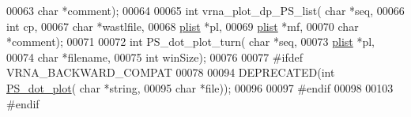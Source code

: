\begin{DoxyCode}
00063                       \textcolor{keywordtype}{char} *comment);
00064 
00065 \textcolor{keywordtype}{int} vrna\_plot\_dp\_PS\_list( \textcolor{keywordtype}{char} *seq,
00066                           \textcolor{keywordtype}{int} cp,
00067                           \textcolor{keywordtype}{char} *wastlfile,
00068                           \hyperlink{group__data__structures_structvrna__plist__s}{plist} *pl,
00069                           \hyperlink{group__data__structures_structvrna__plist__s}{plist} *mf,
00070                           \textcolor{keywordtype}{char} *comment);
00071 
00072 \textcolor{keywordtype}{int} PS\_dot\_plot\_turn( \textcolor{keywordtype}{char} *seq,
00073                       \hyperlink{group__data__structures_structvrna__plist__s}{plist} *pl,
00074                       \textcolor{keywordtype}{char} *filename,
00075                       \textcolor{keywordtype}{int} winSize);
00076 
00077 \textcolor{preprocessor}{#ifdef VRNA\_BACKWARD\_COMPAT}
00078 
00094 DEPRECATED(\textcolor{keywordtype}{int} \hyperlink{group__plotting__utils_ga689a97a7e3b8a2df14728b8204d9d57b}{PS\_dot\_plot}( \textcolor{keywordtype}{char} *\textcolor{keywordtype}{string},
00095                             \textcolor{keywordtype}{char} *file));
00096 
00097 \textcolor{preprocessor}{#endif}
00098 
00103 \textcolor{preprocessor}{#endif}
\end{DoxyCode}
